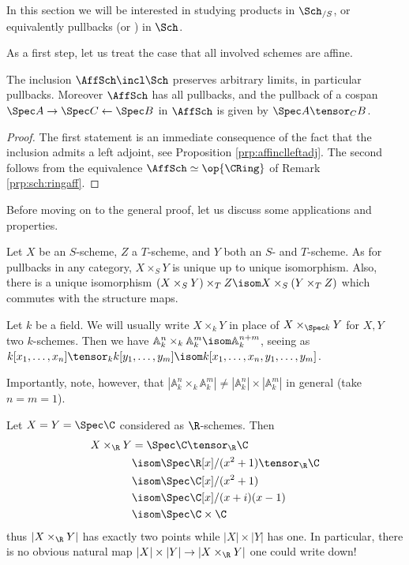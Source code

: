 \documentclass[wip, algebra]{bsteffan-lecturenotes}
\newcommand{\A}{\mathbb{A}}
\begin{document}
In this section we will be interested in studying products in $\Sch_{/ S}$, or equivalently pullbacks (or ) in $\Sch$.

As a first step, let us treat the case that all involved schemes are affine.
\begin{proposition}
	The inclusion $\AffSch \incl \Sch$ preserves arbitrary limits, in particular pullbacks.
	Moreover $\AffSch$ has all pullbacks, and the pullback of a cospan $\Spec A \rightarrow \Spec C \leftarrow \Spec B$ in $\AffSch$ is given by $\Spec A \tensor_C B$.
\end{proposition}
\begin{proof}
	The first statement is an immediate consequence of the fact that the inclusion admits a left adjoint, see Proposition \ref{prp:affinclleftadj}.
	The second follows from the equivalence $\AffSch \simeq \op{\CRing}$ of Remark \ref{prp:sch:ringaff}.
\end{proof}
Before moving on to the general proof, let us discuss some applications and properties.
\begin{remark}
	Let $X$ be an $S$-scheme, $Z$ a $T$-scheme, and $Y$ both an $S$- and $T$-scheme.
	As for pullbacks in any category, $X \times_S Y$ is unique up to unique isomorphism.
	Also, there is a unique isomorphism $(X \times_S Y) \times_T Z \isom X \times_S (Y \times_T Z)$ which commutes with the structure maps.
\end{remark}
\begin{example}
	Let $k$ be a field.
	We will usually write $X \times_k Y$ in place of $X \times_{\Spec k} Y$ for $X, Y$ two $k$-schemes.
	Then we have $\A^n_k \times_k \A^m_k \isom \A^{n + m}_k$, seeing as $k[x_1, \ldots, x_n] \tensor_k k[y_1, \ldots, y_m] \isom k[x_1, \ldots, x_n, y_1, \ldots, y_m]$.

	Importantly, note, however, that $|\A^n_k \times_k \A^m_k| \neq |\A^n_k| \times |\A^m_k|$ in general (take $n = m = 1$).
\end{example}
\begin{example}\label{epl:sch:fpR}
	Let $X = Y = \Spec \C$ considered as $\R$-schemes.
	Then
	\begin{align*}
		X \times_\R Y &= \Spec \C \tensor_\R \C \\
					  &\isom \Spec \R[x] / (x^2 + 1) \tensor_\R \C \\
					  &\isom \Spec \C[x] / (x^2 + 1) \\
					  &\isom \Spec \C[x] / (x + i)(x - 1) \\
					  &\isom \Spec \C \times \C
	\end{align*}
	thus $|X \times_\R Y|$ has exactly two points while $|X| \times |Y|$ has one.
	In particular, there is no obvious natural map $|X| \times |Y| \to |X \times_\R Y|$ one could write down!
\end{example}
\end{document}
